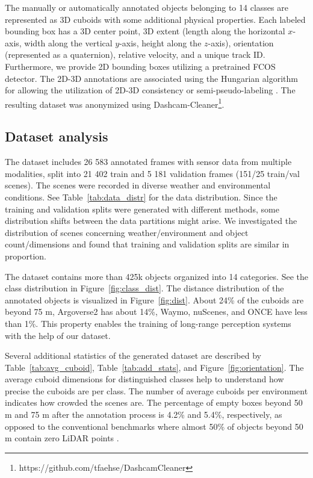 \documentclass{article}
\begin{document}
The manually or automatically annotated objects belonging to 14 classes are represented as 3D cuboids with some additional physical properties. Each labeled bounding box has a 3D center point, 3D extent (length along the horizontal $x$-axis, width along the vertical $y$-axis, height along the $z$-axis), orientation (represented as a quaternion), relative velocity, and a unique track ID. Furthermore, we provide 2D bounding boxes utilizing a pretrained FCOS \citep{tian2019fcos} detector. The 2D-3D annotations are associated using the Hungarian algorithm \citep{kuhn1955hungarian} for allowing the utilization of 2D-3D consistency or semi-pseudo-labeling \citep{matuszka2022novel}. The resulting dataset was anonymized using Dashcam-Cleaner\footnote{https://github.com/tfaehse/DashcamCleaner}.

\subsection{Dataset analysis}
The dataset includes 26 583 annotated frames with sensor data from multiple modalities, split into 21 402 train and 5 181 validation frames (151/25 train/val scenes). The scenes were recorded in diverse weather and environmental conditions. See Table~\ref{tab:data_distr} for the data distribution. Since the training and validation splits were generated with different methods, some distribution shifts between the data partitions might arise. We investigated the distribution of scenes concerning weather/environment and object count/dimensions and found that training and validation splits are similar in proportion.

The dataset contains more than 425k objects organized into 14 categories. See the class distribution in Figure~\ref{fig:class_dist}. The distance distribution of the annotated objects is visualized in Figure~\ref{fig:dist}. About 24\% of the cuboids are beyond 75 m, Argoverse2 has about 14\%, Waymo, nuScenes, and ONCE have less than 1\%. This property enables the training of long-range perception systems with the help of our dataset. 

Several additional statistics of the generated dataset are described by Table~\ref{tab:avg_cuboid}, Table~\ref{tab:add_stats}, and Figure~\ref{fig:orientation}. The average cuboid dimensions for distinguished classes help to understand how precise the cuboids are per class. The number of average cuboids per environment indicates how crowded the scenes are. The percentage of empty boxes beyond 50 m and 75 m after the annotation process is 4.2\% and 5.4\%, respectively, as opposed to the conventional benchmarks where almost 50\% of objects beyond 50 m contain zero LiDAR points \citep{gupta2023far3det}. 
\end{document}
